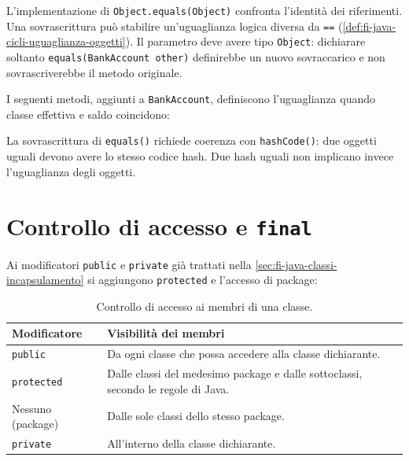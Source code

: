 L'implementazione di \texttt{Object.equals(Object)}
confronta l'identità dei riferimenti. Una sovrascrittura può
stabilire un'uguaglianza logica diversa da \texttt{==}
(\cref{def:fi-java-cicli-uguaglianza-oggetti}). Il parametro
deve avere tipo \texttt{Object}: dichiarare soltanto
\lstinline|equals(BankAccount other)| definirebbe un nuovo
sovraccarico e non sovrascriverebbe il metodo originale.

\begin{example}
I seguenti metodi, aggiunti a \texttt{BankAccount}, definiscono
l'uguaglianza quando classe effettiva e saldo coincidono:



La sovrascrittura di \texttt{equals()} richiede coerenza con
\texttt{hashCode()}: due oggetti uguali devono avere lo stesso
codice hash. Due hash uguali non implicano invece l'uguaglianza
degli oggetti.
\end{example}

\clearpage

\section{Controllo di accesso e \texttt{final}}
\label{sec:fi-java-interfacce-accesso}

Ai modificatori \texttt{public} e \texttt{private} già trattati
nella \cref{sec:fi-java-classi-incapsulamento} si aggiungono
\texttt{protected} e l'accesso di package:

\begin{table}[htbp]
\centering
\begin{tabular}{p{3.0cm}p{9.0cm}}
\toprule
Modificatore & Visibilità dei membri \\
\midrule
\texttt{public} & Da ogni classe che possa accedere alla classe dichiarante. \\
\texttt{protected} & Dalle classi del medesimo package e dalle sottoclassi, secondo le regole di Java. \\
Nessuno (package) & Dalle sole classi dello stesso package. \\
\texttt{private} & All'interno della classe dichiarante. \\
\bottomrule
\end{tabular}
\caption{Controllo di accesso ai membri di una classe.}
\label{tab:fi-java-interfacce-accesso}
\end{table}

